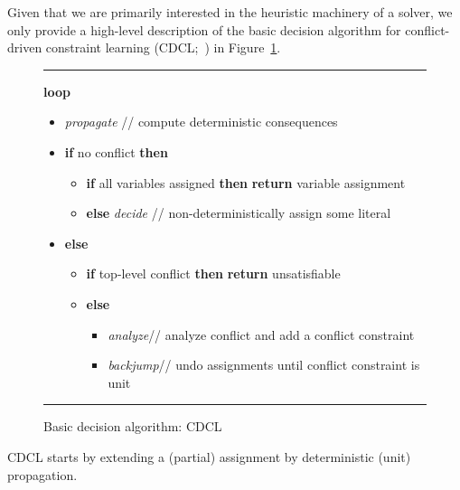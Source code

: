 \documentclass[letterpaper]{article}
\begin{document}
Given that we are primarily interested in the heuristic machinery of a solver,
we only provide a high-level description of the basic decision algorithm for 
conflict-driven constraint learning (CDCL;~\cite{marsak99a,zamamoma01a})
in Figure~\ref{algo:cdcl}.
%
\begin{figure}[t]
\newcommand{\ITEMHACK}{\itemindent=-5pt\itemsep=0pt\parsep=\itemsep}
\small
\hrule\vspace{2pt}
\noindent\textbf{loop}\\[-12pt]
  \begin{itemize}\ITEMHACK
  \item [] \textit{propagate}  
    \hfill// compute deterministic consequences
  \item [] \textbf{if} no conflict \textbf{then}
    \begin{itemize}\ITEMHACK
    \item [] \textbf{if} all variables assigned 
      \textbf{then} 
      \textbf{return} variable assignment
    \item [] \textbf{else}
      \textit{decide} 
      \hfill// non-deterministically assign some literal
    \end{itemize}
  \item [] \textbf{else} 
    \begin{itemize}\ITEMHACK
    \item [] \textbf{if} top-level conflict %
      \textbf{then} 
      \textbf{return} unsatisfiable
    \item [] \textbf{else}
      \begin{itemize}\ITEMHACK
      \item [] \textit{analyze}\hfill// analyze conflict and add a conflict constraint
      \item [] \textit{backjump}\hfill// undo assignments until conflict constraint is unit
      \end{itemize}
    \end{itemize}
  \end{itemize}
  \hrule  
  \caption{Basic decision algorithm: CDCL}
  \label{algo:cdcl}
\end{figure}
CDCL starts by extending a (partial) {assignment} by deterministic (unit) propagation.
\end{document}
